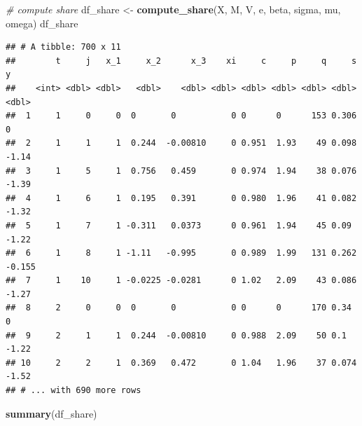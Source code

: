 \documentclass[]{book}
\newenvironment{Shaded}{\begin{snugshade}}{\end{snugshade}}
\newcommand{\KeywordTok}[1]{\textcolor[rgb]{0.13,0.29,0.53}{\textbf{#1}}}
\newcommand{\StringTok}[1]{\textcolor[rgb]{0.31,0.60,0.02}{#1}}
\newcommand{\CommentTok}[1]{\textcolor[rgb]{0.56,0.35,0.01}{\textit{#1}}}
\newcommand{\NormalTok}[1]{#1}
\begin{document}
\begin{Shaded}
\begin{Highlighting}[]
\CommentTok{# compute share}
\NormalTok{df_share <-}
\StringTok{  }\KeywordTok{compute_share}\NormalTok{(X, M, V, e, beta, sigma, }
\NormalTok{                mu, omega)}
\NormalTok{df_share}
\end{Highlighting}
\end{Shaded}

\begin{verbatim}
## # A tibble: 700 x 11
##        t     j   x_1     x_2      x_3    xi     c     p     q     s      y
##    <int> <dbl> <dbl>   <dbl>    <dbl> <dbl> <dbl> <dbl> <dbl> <dbl>  <dbl>
##  1     1     0     0  0       0           0 0      0      153 0.306  0    
##  2     1     1     1  0.244  -0.00810     0 0.951  1.93    49 0.098 -1.14 
##  3     1     5     1  0.756   0.459       0 0.974  1.94    38 0.076 -1.39 
##  4     1     6     1  0.195   0.391       0 0.980  1.96    41 0.082 -1.32 
##  5     1     7     1 -0.311   0.0373      0 0.961  1.94    45 0.09  -1.22 
##  6     1     8     1 -1.11   -0.995       0 0.989  1.99   131 0.262 -0.155
##  7     1    10     1 -0.0225 -0.0281      0 1.02   2.09    43 0.086 -1.27 
##  8     2     0     0  0       0           0 0      0      170 0.34   0    
##  9     2     1     1  0.244  -0.00810     0 0.988  2.09    50 0.1   -1.22 
## 10     2     2     1  0.369   0.472       0 1.04   1.96    37 0.074 -1.52 
## # ... with 690 more rows
\end{verbatim}

\begin{Shaded}
\begin{Highlighting}[]
\KeywordTok{summary}\NormalTok{(df_share)}
\end{Highlighting}
\end{Shaded}
\end{document}
